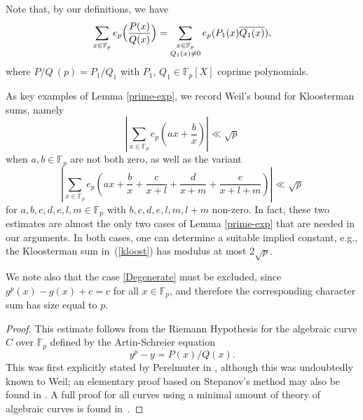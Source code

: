 \documentclass[12pt,a4paper,reqno]{amsart}
\numberwithin{equation}{section}
\theoremstyle{plain}
\theoremstyle{definition}
\newcommand\F{\mathbb{F}}
\newcommand\Q{\mathbb{Q}}
\begin{document}
Note that, by our definitions, we have
$$
\sum_{x \in \F_p} e_p\Bigl(\frac{P(x)}{Q(x)}\Bigr) = \sum_{\substack{x \in
    \F_p\\Q_1(x) \neq 0}} e_p(P_1(x) \overline{Q_1(x)}),
$$ 
where $P/Q\ (p)=P_1/Q_1$ with $P_1$, $Q_1\in \F_p[X]$ coprime
polynomials. 
\par
As key examples of Lemma \ref{prime-exp}, we record Weil's bound for
Kloosterman sums, namely
\begin{equation}\label{kloost}
\left|\sum_{x \in \F_p} e_p\left( ax + \frac{b}{x} \right)\right| \ll \sqrt{p}
\end{equation}
when $a,b \in \F_p$ are not both zero, as well as the variant
\begin{equation}\label{kloost-2}
  \left|\sum_{x \in \F_p} e_p\left( ax + \frac{b}{x} + 
      \frac{c}{x+l} +\frac{d}{x+m}+\frac{e}{x+l+m}\right)\right| \ll \sqrt{p}
\end{equation}
for $a,b,c,d,e,l,m \in \F_p$ with $b,c,d,e,l,m,l+m$ non-zero.  In
fact, these two estimates are almost the only two cases of Lemma
\ref{prime-exp} that are needed in our arguments. In both cases, one
can determine a suitable implied constant, e.g., the Kloosterman sum
in~(\ref{kloost}) has modulus at most $2\sqrt{p}$.

We note also that the case \eqref{Degenerate} must be excluded, since
$g^p(x)-g(x)+c=c$ for all $x\in\F_p$, and therefore the corresponding
character sum has size equal to $p$.

\begin{proof} 
  This estimate follows from the Riemann Hypothesis for the algebraic
  curve $C$ over $\F_p$ defined by the Artin-Schreier equation
$$
y^p-y = P(x)/Q(x).
$$
This was first explicitly stated by Perelmuter in \cite{perelmuter},
although this was undoubtedly known to Weil; an elementary proof based
on Stepanov's method may also be found in \cite{cochrane}. A full
proof for all curves using a minimal amount of theory of algebraic
curves is found in~\cite{bombieri-stepanov}.
\end{proof}
\end{document}
